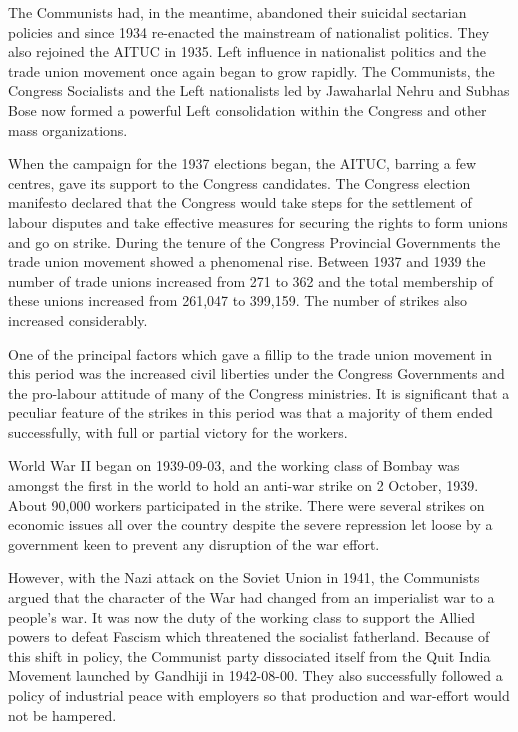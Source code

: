 \begin{multicols}{2}
The Communists had, in the meantime, abandoned their suicidal sectarian policies and since 1934 re-enacted the mainstream of nationalist politics. They also rejoined the AITUC in 1935. Left influence in nationalist politics and the trade union movement once again began to grow rapidly. The Communists, the Congress Socialists and the Left nationalists led by Jawaharlal Nehru and Subhas Bose now formed a powerful Left consolidation within the Congress and other mass organizations.

When the campaign for the 1937 elections began, the AITUC, barring a few centres, gave its support to the Congress candidates. The Congress election manifesto declared that the Congress would take steps for the settlement of labour disputes and take effective measures for securing the rights to form unions and go on strike. During the tenure of the Congress Provincial Governments the trade union movement showed a phenomenal rise. Between 1937 and 1939 the number of trade unions increased from 271 to 362 and the total membership of these unions increased from 261,047 to 399,159. The number of strikes also increased considerably.

One of the principal factors which gave a fillip to the trade union movement in this period was the increased civil liberties under the Congress Governments and the pro-labour attitude of many of the Congress ministries. It is significant that a peculiar feature of the strikes in this period was that a majority of them ended successfully, with full or partial victory for the workers.

World War II began on 1939-09-03, and the working class of Bombay was amongst the first in the world to hold an anti-war strike on 2 October, 1939. About 90,000 workers participated in the strike. There were several strikes on economic issues all over the country despite the severe repression let loose by a government keen to prevent any disruption of the war effort.

However, with the Nazi attack on the Soviet Union in 1941, the Communists argued that the character of the War had changed from an imperialist war to a people's war. It was now the duty of the working class to support the Allied powers to defeat Fascism which threatened the socialist fatherland. Because of this shift in policy, the Communist party dissociated itself from the Quit India Movement launched by Gandhiji in 1942-08-00. They also successfully followed a policy of industrial peace with employers so that production and war-effort would not be hampered.


\end{multicols}
